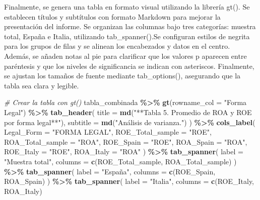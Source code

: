 \documentclass[
]{article}
\newenvironment{Shaded}{\begin{snugshade}}{\end{snugshade}}
\newcommand{\AttributeTok}[1]{\textcolor[rgb]{0.13,0.29,0.53}{#1}}
\newcommand{\CommentTok}[1]{\textcolor[rgb]{0.56,0.35,0.01}{\textit{#1}}}
\newcommand{\FunctionTok}[1]{\textcolor[rgb]{0.13,0.29,0.53}{\textbf{#1}}}
\newcommand{\NormalTok}[1]{#1}
\newcommand{\SpecialCharTok}[1]{\textcolor[rgb]{0.81,0.36,0.00}{\textbf{#1}}}
\newcommand{\StringTok}[1]{\textcolor[rgb]{0.31,0.60,0.02}{#1}}
\begin{document}
Finalmente, se genera una tabla en formato visual utilizando la librería
gt(). Se establecen títulos y subtítulos con formato Markdown para
mejorar la presentación del informe. Se organizan las columnas bajo tres
categorías: muestra total, España e Italia, utilizando tab\_spanner().Se
configuran estilos de negrita para los grupos de filas y se alinean los
encabezados y datos en el centro. Además, se añaden notas al pie para
clarificar que los valores p aparecen entre paréntesis y que los niveles
de significancia se indican con asteriscos. Finalmente, se ajustan los
tamaños de fuente mediante tab\_options(), asegurando que la tabla sea
clara y legible.

\begin{Shaded}
\begin{Highlighting}[]
\CommentTok{\# Crear la tabla con \textasciigrave{}gt()\textasciigrave{}}
\NormalTok{tabla\_combinada }\SpecialCharTok{\%\textgreater{}\%}
  \FunctionTok{gt}\NormalTok{(}\AttributeTok{rowname\_col =} \StringTok{"Forma Legal"}\NormalTok{) }\SpecialCharTok{\%\textgreater{}\%}
  \FunctionTok{tab\_header}\NormalTok{(}
    \AttributeTok{title =} \FunctionTok{md}\NormalTok{(}\StringTok{"**Tabla 5. Promedio de ROA y ROE por forma legal**"}\NormalTok{),}
    \AttributeTok{subtitle =} \FunctionTok{md}\NormalTok{(}\StringTok{"Análisis de varianza."}\NormalTok{)}
\NormalTok{  ) }\SpecialCharTok{\%\textgreater{}\%}
  \FunctionTok{cols\_label}\NormalTok{(}
    \AttributeTok{Legal\_Form =} \StringTok{"FORMA LEGAL"}\NormalTok{,}
    \AttributeTok{ROE\_Total\_sample =} \StringTok{"ROE"}\NormalTok{,}
    \AttributeTok{ROA\_Total\_sample =} \StringTok{"ROA"}\NormalTok{,}
    \AttributeTok{ROE\_Spain =} \StringTok{"ROE"}\NormalTok{,}
    \AttributeTok{ROA\_Spain =} \StringTok{"ROA"}\NormalTok{,}
    \AttributeTok{ROE\_Italy =} \StringTok{"ROE"}\NormalTok{,}
    \AttributeTok{ROA\_Italy =} \StringTok{"ROA"}
\NormalTok{  ) }\SpecialCharTok{\%\textgreater{}\%}
  \FunctionTok{tab\_spanner}\NormalTok{(}
    \AttributeTok{label =} \StringTok{"Muestra total"}\NormalTok{,}
    \AttributeTok{columns =} \FunctionTok{c}\NormalTok{(ROE\_Total\_sample, ROA\_Total\_sample)}
\NormalTok{  ) }\SpecialCharTok{\%\textgreater{}\%}
  \FunctionTok{tab\_spanner}\NormalTok{(}
    \AttributeTok{label =} \StringTok{"España"}\NormalTok{,}
    \AttributeTok{columns =} \FunctionTok{c}\NormalTok{(ROE\_Spain, ROA\_Spain)}
\NormalTok{  ) }\SpecialCharTok{\%\textgreater{}\%}
  \FunctionTok{tab\_spanner}\NormalTok{(}
    \AttributeTok{label =} \StringTok{"Italia"}\NormalTok{,}
    \AttributeTok{columns =} \FunctionTok{c}\NormalTok{(ROE\_Italy, ROA\_Italy)}

\end{Highlighting}
\end{Shaded}
\end{document}

